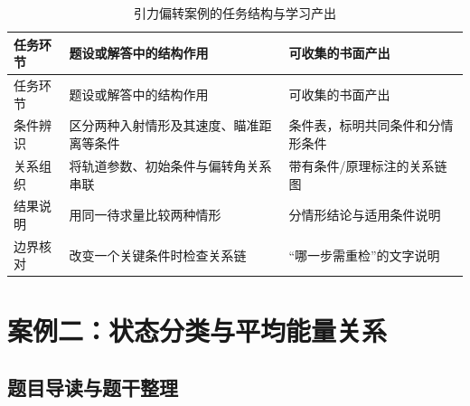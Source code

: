 \documentclass[
  12pt,
  a4paper,twoside,openany]{ctexbook}
\begin{document}
\begin{longtable}[]{@{}
  >{\raggedright\arraybackslash}p{}
  >{\raggedright\arraybackslash}p{}
  >{\raggedright\arraybackslash}p{}@{}}
\caption{引力偏转案例的任务结构与学习产出}\tabularnewline
\toprule\noalign{}
\rowcolor{ThesisPale}
\begin{minipage}[b]{\linewidth}\raggedright
任务环节
\end{minipage} & \begin{minipage}[b]{\linewidth}\raggedright
题设或解答中的结构作用
\end{minipage} & \begin{minipage}[b]{\linewidth}\raggedright
可收集的书面产出
\end{minipage} \\
\midrule\noalign{}
\endfirsthead
\toprule\noalign{}
\rowcolor{ThesisPale}
\begin{minipage}[b]{\linewidth}\raggedright
任务环节
\end{minipage} & \begin{minipage}[b]{\linewidth}\raggedright
题设或解答中的结构作用
\end{minipage} & \begin{minipage}[b]{\linewidth}\raggedright
可收集的书面产出
\end{minipage} \\
\midrule\noalign{}
\endhead
\bottomrule\noalign{}
\endlastfoot
条件辨识 & 区分两种入射情形及其速度、瞄准距离等条件 &
条件表，标明共同条件和分情形条件 \\
关系组织 & 将轨道参数、初始条件与偏转角关系串联 &
带有条件/原理标注的关系链图 \\
结果说明 & 用同一待求量比较两种情形 & 分情形结论与适用条件说明 \\
边界核对 & 改变一个关键条件时检查关系链 & ``哪一步需重检''的文字说明 \\
\end{longtable}

\section{案例二：状态分类与平均能量关系}\label{ux6848ux4f8bux4e8cux72b6ux6001ux5206ux7c7bux4e0eux5e73ux5747ux80fdux91cfux5173ux7cfb}

\subsection{题目导读与题干整理}\label{ux9898ux76eeux5bfcux8bfbux4e0eux9898ux5e72ux6574ux7406-1}
\end{document}
